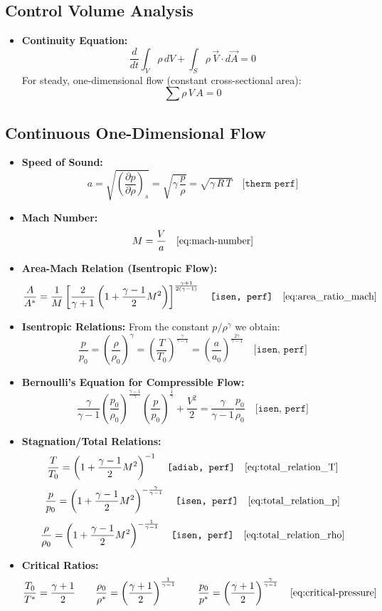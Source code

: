 \subsection*{Control Volume Analysis}
\begin{itemize}
    \item \textbf{Continuity Equation:}  
    $$
	    \frac{d}{dt} \int_V \rho\,dV + \int_S \rho\, \vec{V}\cdot d\vec{A} = 0
    $$
    For steady, one-dimensional flow (constant cross-sectional area):
    $$
		\sum \rho\,V\,A = 0
    $$
\end{itemize}

\subsection*{Continuous One-Dimensional Flow}
\begin{itemize}
    \item \textbf{Speed of Sound:}  
    $$
	    a = \sqrt{\left(\frac{\partial p}{\partial \rho}\right)_s} = \sqrt{\gamma\,\frac{p}{\rho}} = \sqrt{\gamma\,R\,T} \quad \texttt{[therm perf]}
    $$
    \item \textbf{Mach Number:}  
    $$
	    M = \frac{V}{a}\quad\eqref{eq:mach-number}
    $$
    \item \textbf{Area-Mach Relation (Isentropic Flow):}  
    $$
	    \frac{A}{A^*} = \frac{1}{M}\left[\frac{2}{\gamma+1}\left(1+\frac{\gamma-1}{2}M^2\right)\right]^{\frac{\gamma+1}{2(\gamma-1)}} \quad \texttt{[isen, perf]}\quad\eqref{eq:area_ratio_mach}
    $$
    \item \textbf{Isentropic Relations:}  
    From the constant $ p/\rho^\gamma $ we obtain:
    $$
	    \frac{p}{p_0} = \left(\frac{\rho}{\rho_0}\right)^\gamma = \left(\frac{T}{T_0}\right)^{\frac{\gamma}{\gamma-1}} = \left(\frac{a}{a_0}\right)^{\frac{2\gamma}{\gamma-1}} \quad \texttt{[isen, perf]}
    $$
    \item \textbf{Bernoulli’s Equation for Compressible Flow:}  
    $$
	    \frac{\gamma}{\gamma-1}\left(\frac{p_0}{\rho_0}\right)^{\frac{\gamma-1}{\gamma}}\left(\frac{p}{p_0}\right)^{\frac{1}{\gamma}} + \frac{V^2}{2} = \frac{\gamma}{\gamma-1}\frac{p_0}{\rho_0} \quad \texttt{[isen, perf]}
    $$
    \item \textbf{Stagnation/Total Relations:}  
    $$
	    \frac{T}{T_0} = \left(1+\frac{\gamma-1}{2}M^2\right)^{-1} \quad \texttt{[adiab, perf]} \quad \eqref{eq:total_relation_T}
    $$
    $$
	    \frac{p}{p_0} = \left(1+\frac{\gamma-1}{2}M^2\right)^{-\frac{\gamma}{\gamma-1}} \quad \texttt{[isen, perf]} \quad \eqref{eq:total_relation_p}
    $$
    $$
	    \frac{\rho}{\rho_0} = \left(1+\frac{\gamma-1}{2}M^2\right)^{-\frac{1}{\gamma-1}} \quad \texttt{[isen, perf]} \quad \eqref{eq:total_relation_rho}
    $$
    \item \textbf{Critical Ratios:}  
    $$
	    \frac{T_0}{T^*} = \frac{\gamma+1}{2}
			\qquad
	    \frac{\rho_0}{\rho^*} = \left(\frac{\gamma+1}{2}\right)^{\frac{1}{\gamma-1}}
			\qquad
	    \frac{p_0}{p^*} = \left(\frac{\gamma+1}{2}\right)^{\frac{\gamma}{\gamma-1}} \quad \eqref{eq:critical-pressure}
    $$
\end{itemize}

